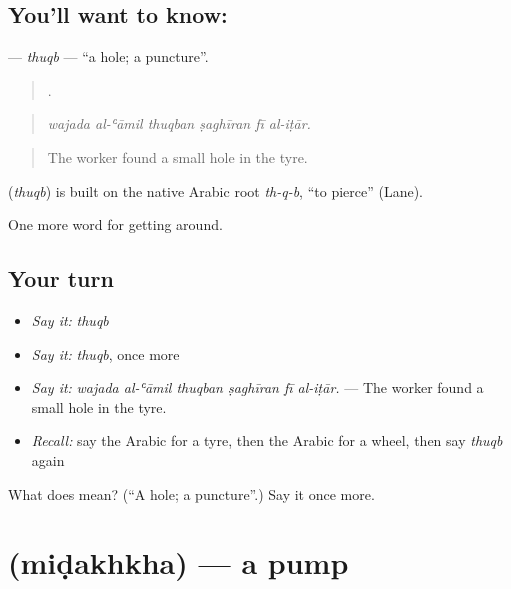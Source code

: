 \subsection*{You'll want to know: }
\textbf{} — \emph{thuqb} — \textquotedblleft{}a hole; a puncture\textquotedblright{}.

\begin{quote}
     .
\end{quote}

\begin{quote}
\emph{wajada al-ʿāmil thuqban ṣaghīran fī al-iṭār.}
\end{quote}

\begin{quote}
The worker found a small hole in the tyre.
\end{quote}

\begin{cousinweb}
\textbf{} (\emph{thuqb}) is built on the native Arabic root \emph{th-q-b}, \textquotedblleft{}to pierce\textquotedblright{} (Lane).
\end{cousinweb}

\begin{grammarlens}[title={What you've built}]
One more word for getting around.
\end{grammarlens}

\subsection*{Your turn}
\begin{itemize}
\raggedright
  \item \emph{Say it:} \emph{thuqb}
  \item \emph{Say it:} \emph{thuqb}, once more
  \item \emph{Say it:} \emph{wajada al-ʿāmil thuqban ṣaghīran fī al-iṭār.} — The worker found a small hole in the tyre.
  \item \emph{Recall:} say the Arabic for a tyre, then the Arabic for a wheel, then say \emph{thuqb} again
\end{itemize}

\begin{tcolorbox}[breakable,colback=teal!4,colframe=teal!35!black,title={Before you move on}]
What does  mean? (\textquotedblleft{}A hole; a puncture\textquotedblright{}.) Say it once more.
\end{tcolorbox}
\section[\texorpdfstring{\ar{مضخة} (miḍakhkha)}{مضخة (miḍakhkha)}]{ (miḍakhkha) — a pump}

